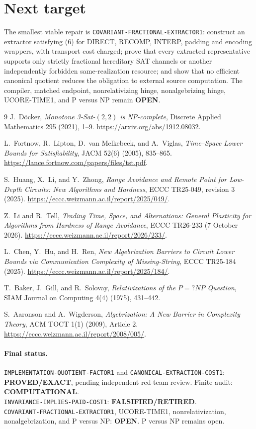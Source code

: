 \documentclass[11pt]{article}
\newcommand{\EXACT}{\textbf{PROVED/EXACT}}
\newcommand{\OPEN}{\textbf{OPEN}}
\newcommand{\RETIRED}{\textbf{FALSIFIED/RETIRED}}
\newcommand{\COMP}{\textbf{COMPUTATIONAL}}
\begin{document}
\section{Next target}

The smallest viable repair is \texttt{COVARIANT-FRACTIONAL-EXTRACTOR1}:
construct an extractor satisfying (6) for DIRECT, RECOMP, INTERP, padding and
encoding wrappers, with transport cost charged; prove that every extracted
representative supports only strictly fractional hereditary SAT channels or
another independently forbidden same-realization resource; and show that no
efficient canonical quotient reduces the obligation to external source
computation.  The compiler, matched endpoint, nonrelativizing hinge,
nonalgebrizing hinge, UCORE-TIME1, and P versus NP remain \OPEN.

\begin{thebibliography}{9}
J.~D\"ocker, \emph{Monotone 3-Sat-$(2,2)$ is NP-complete},
Discrete Applied Mathematics 295 (2021), 1--9.
\url{https://arxiv.org/abs/1912.08032}.

L.~Fortnow, R.~Lipton, D.~van Melkebeek, and A.~Viglas,
\emph{Time--Space Lower Bounds for Satisfiability}, JACM 52(6) (2005),
835--865. \url{https://lance.fortnow.com/papers/files/tst.pdf}.

S.~Huang, X.~Li, and Y.~Zhong,
\emph{Range Avoidance and Remote Point for Low-Depth Circuits: New Algorithms
and Hardness}, ECCC TR25-049, revision 3 (2025).
\url{https://eccc.weizmann.ac.il/report/2025/049/}.

Z.~Li and R.~Tell,
\emph{Trading Time, Space, and Alternations: General Plasticity for Algorithms
from Hardness of Range Avoidance}, ECCC TR26-233 (7 October 2026).
\url{https://eccc.weizmann.ac.il/report/2026/233/}.

L.~Chen, Y.~Hu, and H.~Ren,
\emph{New Algebrization Barriers to Circuit Lower Bounds via Communication
Complexity of Missing-String}, ECCC TR25-184 (2025).
\url{https://eccc.weizmann.ac.il/report/2025/184/}.

T.~Baker, J.~Gill, and R.~Solovay,
\emph{Relativizations of the $P=?NP$ Question}, SIAM Journal on Computing
4(4) (1975), 431--442.

S.~Aaronson and A.~Wigderson,
\emph{Algebrization: A New Barrier in Complexity Theory}, ACM TOCT 1(1)
(2009), Article 2. \url{https://eccc.weizmann.ac.il/report/2008/005/}.
\end{thebibliography}

\paragraph{Final status.}
\texttt{IMPLEMENTATION-QUOTIENT-FACTOR1} and
\texttt{CANONICAL-EXTRACTION-COST1}: \EXACT, pending independent red-team
review.  Finite audit: \COMP.\\
\texttt{INVARIANCE-IMPLIES-PAID-COST1}: \RETIRED.\\
\texttt{COVARIANT-FRACTIONAL-EXTRACTOR1}, UCORE-TIME1,
nonrelativization, nonalgebrization, and P versus NP: \OPEN.
P versus NP remains open.

\end{document}
